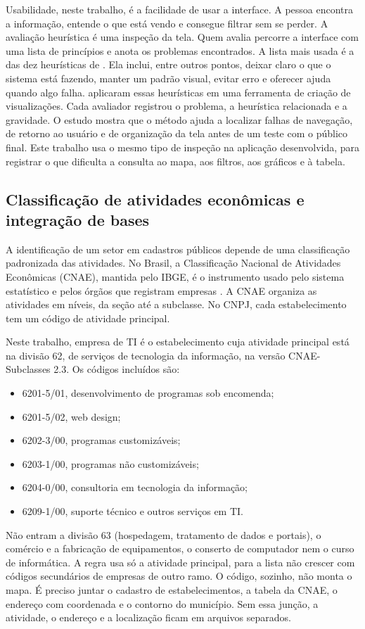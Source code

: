 Usabilidade, neste trabalho, é a facilidade de usar a interface.
A pessoa encontra a informação, entende o que está vendo e consegue filtrar sem se perder.
A avaliação heurística é uma inspeção da tela.
Quem avalia percorre a interface com uma lista de princípios e anota os problemas encontrados.
A lista mais usada é a das dez heurísticas de .
Ela inclui, entre outros pontos, deixar claro o que o sistema está fazendo, manter um padrão visual, evitar erro e oferecer ajuda quando algo falha.
 aplicaram essas heurísticas em uma ferramenta de criação de visualizações.
Cada avaliador registrou o problema, a heurística relacionada e a gravidade.
O estudo mostra que o método ajuda a localizar falhas de navegação, de retorno ao usuário e de organização da tela antes de um teste com o público final.
Este trabalho usa o mesmo tipo de inspeção na aplicação desenvolvida, para registrar o que dificulta a consulta ao mapa, aos filtros, aos gráficos e à tabela.

\subsection{Classificação de atividades econômicas e integração de bases}

A identificação de um setor em cadastros públicos depende de uma classificação padronizada das atividades.
No Brasil, a Classificação Nacional de Atividades Econômicas (CNAE), mantida pelo IBGE, é o instrumento usado pelo sistema estatístico e pelos órgãos que registram empresas \cite{ibge2020}.
A CNAE organiza as atividades em níveis, da seção até a subclasse.
No CNPJ, cada estabelecimento tem um código de atividade principal.

Neste trabalho, empresa de TI é o estabelecimento cuja atividade principal está na divisão 62, de serviços de tecnologia da informação, na versão CNAE-Subclasses 2.3.
Os códigos incluídos são:
\begin{itemize}
    \item 6201-5/01, desenvolvimento de programas sob encomenda;
    \item 6201-5/02, web design;
    \item 6202-3/00, programas customizáveis;
    \item 6203-1/00, programas não customizáveis;
    \item 6204-0/00, consultoria em tecnologia da informação;
    \item 6209-1/00, suporte técnico e outros serviços em TI.
\end{itemize}
Não entram a divisão 63 (hospedagem, tratamento de dados e portais), o comércio e a fabricação de equipamentos, o conserto de computador nem o curso de informática.
A regra usa só a atividade principal, para a lista não crescer com códigos secundários de empresas de outro ramo.
O código, sozinho, não monta o mapa.
É preciso juntar o cadastro de estabelecimentos, a tabela da CNAE, o endereço com coordenada e o contorno do município.
Sem essa junção, a atividade, o endereço e a localização ficam em arquivos separados.

